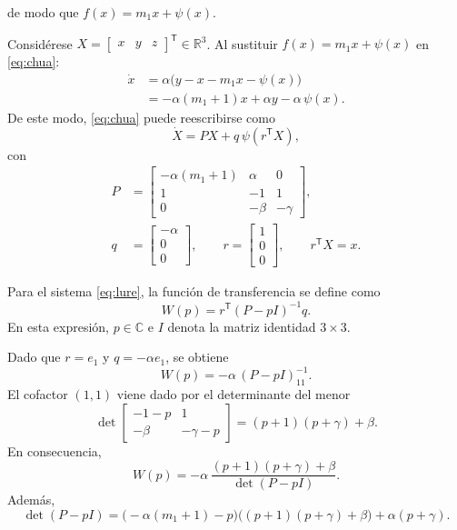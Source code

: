 \documentclass[journal]{IEEEtran}
\begin{document}
\noindent de modo que $f(x)=m_1x+\psi(x)$.

\noindent Considérese $X=\begin{bmatrix}x&y&z\end{bmatrix}^\mathsf{T}\in\mathbb{R}^3$.
Al sustituir $f(x)=m_1x+\psi(x)$ en \eqref{eq:chua}:
\[
\begin{aligned}
\dot x &= \alpha\Big(y-x-m_1x-\psi(x)\Big)\\
       &= -\alpha(m_1+1)x+\alpha y-\alpha\,\psi(x).
\end{aligned}
\]
De este modo, \eqref{eq:chua} puede reescribirse como
\begin{equation}\label{eq:lure}
\dot X = PX + q\,\psi(r^\mathsf{T}X),
\end{equation}
con
\begin{equation}\label{eq:Pqr}
\begin{aligned}
P&=
\begin{bmatrix}
-\alpha(m_1+1) & \alpha & 0\\
1 & -1 & 1\\
0 & -\beta & -\gamma
\end{bmatrix},\\
q&=
\begin{bmatrix}
-\alpha\\0\\0
\end{bmatrix},\qquad
r=
\begin{bmatrix}
1\\0\\0
\end{bmatrix},\qquad
r^\mathsf{T}X=x.
\end{aligned}
\end{equation}

\noindent Para el sistema \eqref{eq:lure}, la función de transferencia se define como
\begin{equation}\label{eq:Wdef}
W(p)=r^\mathsf{T}(P-pI)^{-1}q.
\end{equation}
En esta expresión, $p\in\mathbb{C}$ e $I$ denota la matriz identidad $3\times3$.

\noindent Dado que $r=e_1$ y $q=-\alpha e_1$, se obtiene
\[
W(p)=-\alpha\,(P-pI)^{-1}_{11}.
\]
El cofactor $(1,1)$ viene dado por el determinante del menor
\[
\det\begin{bmatrix}
-1-p & 1\\
-\beta & -\gamma-p
\end{bmatrix}
=(p+1)(p+\gamma)+\beta.
\]
En consecuencia,
\begin{equation}\label{eq:Wexplicit}
W(p)= -\alpha\,\frac{(p+1)(p+\gamma)+\beta}{\det(P-pI)}.
\end{equation}
Además,
\[
\det(P-pI)=\big(-\alpha(m_1+1)-p\big)\big((p+1)(p+\gamma)+\beta\big)
+\alpha(p+\gamma).
\]
\end{document}
